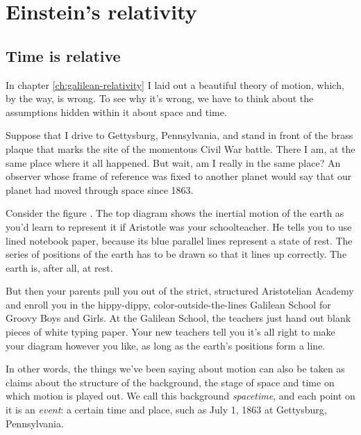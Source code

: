 \chapter{Einstein's relativity}

\section{Time is relative}

In chapter \ref{ch:galilean-relativity} I laid out a beautiful theory of motion, which,
by the way, is wrong. To see why it's wrong, we have to think about the assumptions hidden
within it about space and time.

Suppose that I drive to
Gettysburg, Pennsylvania, and stand in front of the brass plaque that marks the site of
the momentous Civil War battle. There I am, at the same place where it all happened.
But wait, am I really in the same place? An observer whose frame of
reference was fixed to another planet would say that our planet had moved through space since 1863.

\vfill\pagebreak

Consider the figure . The top diagram shows the inertial motion of the earth
as you'd learn to represent it if Aristotle was your schoolteacher. He tells you to use lined notebook
paper, because its blue parallel lines represent a state of rest. The series of positions of the earth
has to be drawn so that it lines up correctly. The earth is, after all, at rest.

\begin{figure}\label{fig:no-simulplaceity}
\end{figure}

But then your parents pull you out of the strict, structured Aristotelian Academy
and enroll you in the hippy-dippy,
color-outside-the-lines Galilean School for Groovy Boys and Girls.
At the Galilean School, the teachers just hand out blank pieces of white typing paper.
Your new teachers tell you it's all right to make your diagram however you like, as
long as the earth's positions form a line.

In other words, the things we've been saying about motion can also be taken as claims about
the structure of the background, the stage of space and time on which motion is played out.
We call this background \emph{spacetime}, and each point on it is an \emph{event}: a certain time and
place, such as July 1, 1863 at Gettysburg, Pennsylvania.

